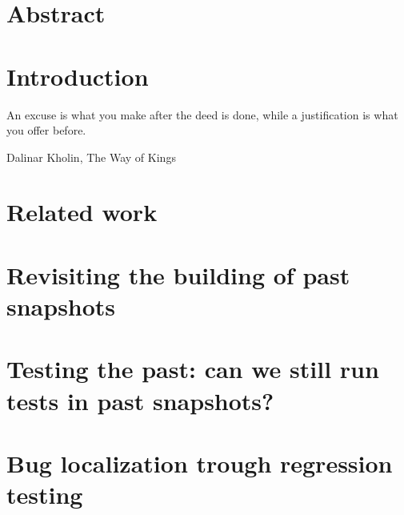 \documentclass[11pt,a4paper,twoside]{book}
\begin{document}
\frontmatter





\chapter{Abstract}




\mainmatter
\restoreHeader

\chapter{Introduction}
\begin{FraseCelebre}
    \begin{Frase}
        An excuse is what you make after the deed is done, while a justification is what you offer before.
    \end{Frase}
    \begin{Fuente}
        Dalinar Kholin, The Way of Kings
    \end{Fuente}
\end{FraseCelebre}
\label{chapter:intro} 
 

\chapter{Related work}
\label{chapter:related-work}


\chapter{Revisiting the building of past snapshots}
\label{chapter:buildability}


\chapter{Testing the past: can we still run tests in past snapshots?}
\label{chapter:testability}


\chapter{Bug localization trough regression testing}
\label{chapter:bug-hunter}

\end{document}
